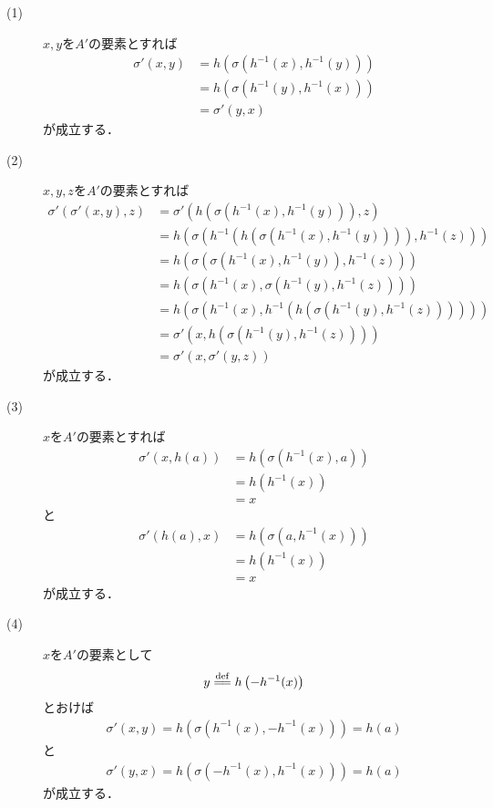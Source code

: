 	\begin{prf}\mbox{}
		\begin{description}
			\item[(1)] $x,y$を$A'$の要素とすれば
				\begin{align}
					\sigma'(x,y) &= h\left(\sigma(h^{-1}(x),h^{-1}(y))\right) \\
					&= h\left(\sigma(h^{-1}(y),h^{-1}(x))\right) \\
					&= \sigma'(y,x)
				\end{align}
				が成立する．
				
			\item[(2)] $x,y,z$を$A'$の要素とすれば
				\begin{align}
					\sigma'\left( \sigma'(x,y),z \right)
					&= \sigma'\left( h\left(\sigma(h^{-1}(x),h^{-1}(y))\right),z \right) \\
					&= h\left(\sigma\left(h^{-1}\left( h\left(\sigma\left(h^{-1}(x),h^{-1}(y)\right)\right) \right),h^{-1}(z)\right)\right) \\
					&= h\left(\sigma\left(\sigma\left(h^{-1}(x),h^{-1}(y)\right),h^{-1}(z)\right)\right) \\
					&= h\left(\sigma\left(h^{-1}(x),\sigma\left(h^{-1}(y),h^{-1}(z)\right)\right)\right) \\
					&= h\left(\sigma\left(h^{-1}(x),h^{-1}\left(h\left(\sigma\left(h^{-1}(y),h^{-1}(z)\right)\right)\right)\right)\right) \\
					&= \sigma'\left( x,h\left(\sigma(h^{-1}(y),h^{-1}(z))\right) \right) \\
					&= \sigma'\left(x,\sigma'\left(y,z\right)\right)
				\end{align}
				が成立する．
			
			\item[(3)] $x$を$A'$の要素とすれば
				\begin{align}
					\sigma'(x,h(a)) &= h\left(\sigma(h^{-1}(x),a)\right) \\
					&= h\left(h^{-1}(x)\right) \\
					&= x
				\end{align}
				と
				\begin{align}
					\sigma'(h(a),x) &= h\left(\sigma(a,h^{-1}(x))\right) \\
					&= h\left(h^{-1}(x)\right) \\
					&= x
				\end{align}
				が成立する．
				
			\item[(4)] $x$を$A'$の要素として
				\begin{align}
					y \defeq h\left(-h^{-1}(x)\right)
				\end{align}
				とおけば
				\begin{align}
					\sigma'(x,y) = h\left(\sigma(h^{-1}(x),-h^{-1}(x))\right) = h(a)
				\end{align}
				と
				\begin{align}
					\sigma'(y,x) = h\left(\sigma(-h^{-1}(x),h^{-1}(x))\right) = h(a)
				\end{align}
				が成立する．
		\end{description}
	\end{prf}

